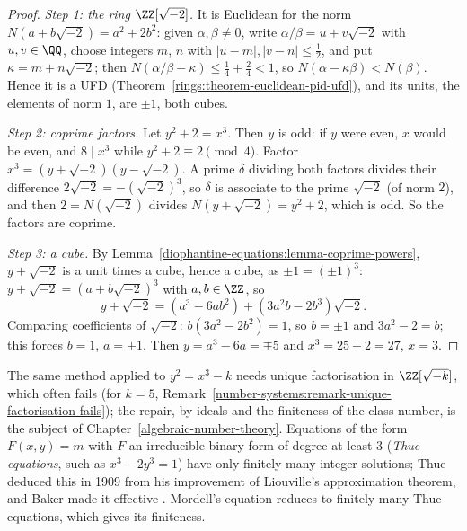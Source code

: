 \begin{proof}
\emph{Step 1: the ring $\ZZ[\sqrt{-2}]$.} It is Euclidean for the norm $N(a + b\sqrt{-2}) = a^2 + 2b^2$: given $\alpha, \beta \neq 0$, write $\alpha/\beta = u + v\sqrt{-2}$ with $u, v \in \QQ$, choose integers $m$,
$n$ with $|u - m|, |v - n| \leq \frac12$, and put $\kappa = m + n\sqrt{-2}$; then $N(\alpha/\beta - \kappa) \leq \frac14 + \frac24 < 1$, so $N(\alpha - \kappa\beta) < N(\beta)$. Hence it is a UFD
(Theorem~\ref{rings:theorem-euclidean-pid-ufd}), and its units, the elements of norm $1$, are $\pm1$, both cubes.

\emph{Step 2: coprime factors.} Let $y^2 + 2 = x^3$. Then $y$ is odd: if $y$ were even, $x$ would be even, and $8 \mid x^3$ while $y^2 + 2 \equiv 2 \pmod 4$. Factor
$x^3 = (y + \sqrt{-2})(y - \sqrt{-2})$. A prime $\delta$ dividing both factors divides their difference $2\sqrt{-2} = -(\sqrt{-2})^3$, so $\delta$ is associate to the prime $\sqrt{-2}$ (of norm $2$), and then
$2 = N(\sqrt{-2})$ divides $N(y + \sqrt{-2}) = y^2 + 2$, which is odd. So the factors are coprime.

\emph{Step 3: a cube.} By Lemma~\ref{diophantine-equations:lemma-coprime-powers}, $y + \sqrt{-2}$ is a unit times a cube, hence a cube, as $\pm1 = (\pm1)^3$: $y + \sqrt{-2} = (a + b\sqrt{-2})^3$ with
$a, b \in \ZZ$, so
\[
y + \sqrt{-2} = (a^3 - 6ab^2) + (3a^2b - 2b^3)\sqrt{-2}.
\]
Comparing coefficients of $\sqrt{-2}$: $b(3a^2 - 2b^2) = 1$, so $b = \pm1$ and $3a^2 - 2 = b$; this forces $b = 1$, $a = \pm1$. Then $y = a^3 - 6a = \mp5$ and $x^3 = 25 + 2 = 27$, $x = 3$.
\end{proof}

\begin{remark}\label{diophantine-equations:remark-mordell}
The same method applied to $y^2 = x^3 - k$ needs unique factorisation in $\ZZ[\sqrt{-k}]$, which often fails (for $k = 5$, Remark~\ref{number-systems:remark-unique-factorisation-fails}); the repair, by ideals
and the finiteness of the class number, is the subject of Chapter~\ref{algebraic-number-theory}. Equations of the form $F(x, y) = m$ with $F$ an irreducible binary form of degree at least $3$ (\emph{Thue
equations}, such as $x^3 - 2y^3 = 1$) have only finitely many integer solutions; Thue deduced this in 1909 from his improvement of Liouville's approximation theorem, and Baker made it effective
\cite{baker-transcendental}. Mordell's equation reduces to finitely many Thue equations, which gives its finiteness.
\end{remark}

